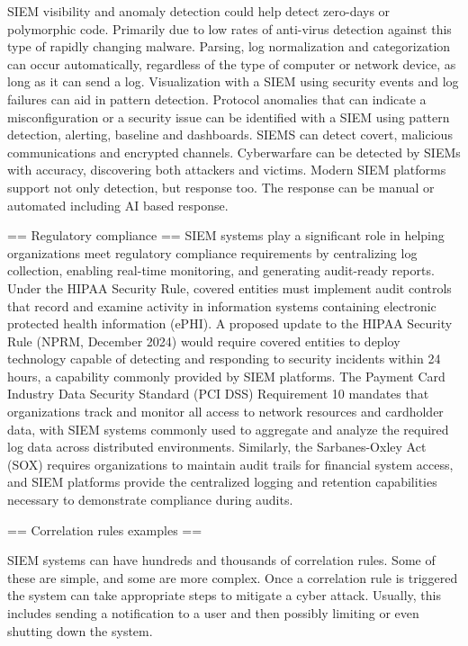 SIEM visibility and anomaly detection could help detect zero-days or polymorphic code. Primarily due to low rates of anti-virus detection against this type of rapidly changing malware.
Parsing, log normalization and categorization can occur automatically, regardless of the type of computer or network device, as long as it can send a log.
Visualization with a SIEM using security events and log failures can aid in pattern detection.
Protocol anomalies that can indicate a misconfiguration or a security issue can be identified with a SIEM using pattern detection, alerting, baseline and dashboards.
SIEMS can detect covert, malicious communications and encrypted channels.
Cyberwarfare can be detected by SIEMs with accuracy, discovering both attackers and victims.
Modern SIEM platforms support not only detection, but response too. The response can be manual or automated including AI based response.


== Regulatory compliance ==
SIEM systems play a significant role in helping organizations meet regulatory compliance requirements by centralizing log collection, enabling real-time monitoring, and generating audit-ready reports. Under the HIPAA Security Rule, covered entities must implement audit controls that record and examine activity in information systems containing electronic protected health information (ePHI). A proposed update to the HIPAA Security Rule (NPRM, December 2024) would require covered entities to deploy technology capable of detecting and responding to security incidents within 24 hours, a capability commonly provided by SIEM platforms.
The Payment Card Industry Data Security Standard (PCI DSS) Requirement 10 mandates that organizations track and monitor all access to network resources and cardholder data, with SIEM systems commonly used to aggregate and analyze the required log data across distributed environments. Similarly, the Sarbanes-Oxley Act (SOX) requires organizations to maintain audit trails for financial system access, and SIEM platforms provide the centralized logging and retention capabilities necessary to demonstrate compliance during audits.


== Correlation rules examples ==

SIEM systems can have hundreds and thousands of correlation rules. Some of these are simple, and some are more complex. Once a correlation rule is triggered the system can take appropriate steps to mitigate a cyber attack. Usually, this includes sending a notification to a user and then possibly limiting or even shutting down the system.


